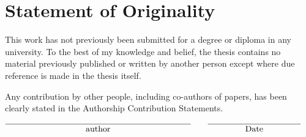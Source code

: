 \chapter{Statement of Originality}

This work has not previously been submitted for a degree or diploma in any university. To the best of my knowledge and belief, the thesis contains no material previously published or written by another person except where due reference is made in the thesis itself.

Any contribution by other people, including co-authors of papers, has been clearly stated in the Authorship Contribution Statements.

\vspace*{1in}

\makeatletter
\begin{center}
  $\stackrel{\text{\rule{3in}{.4pt}}}{\text{\@author}}\quad\quad \stackrel{\text{\rule{1.5in}{.4pt}}}{\text{Date}}$
\end{center}
\makeatother
